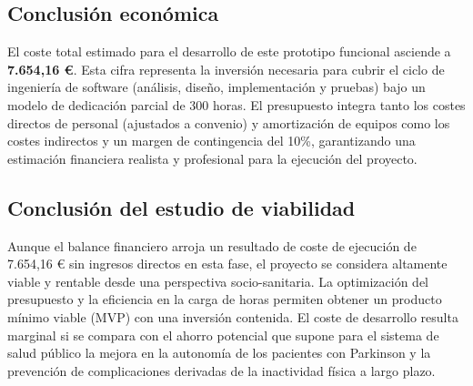 \subsection*{Conclusión económica}
El coste total estimado para el desarrollo de este prototipo funcional asciende a \textbf{7.654,16 €}. Esta cifra representa la inversión necesaria para cubrir el ciclo de ingeniería de software (análisis, diseño, implementación y pruebas) bajo un modelo de dedicación parcial de 300 horas. El presupuesto integra tanto los costes directos de personal (ajustados a convenio) y amortización de equipos como los costes indirectos y un margen de contingencia del 10\%, garantizando una estimación financiera realista y profesional para la ejecución del proyecto.

\subsection*{Conclusión del estudio de viabilidad}
Aunque el balance financiero arroja un resultado de coste de ejecución de 7.654,16 € sin ingresos directos en esta fase, el proyecto se considera altamente viable y rentable desde una perspectiva socio-sanitaria. La optimización del presupuesto y la eficiencia en la carga de horas permiten obtener un producto mínimo viable (MVP) con una inversión contenida. El coste de desarrollo resulta marginal si se compara con el ahorro potencial que supone para el sistema de salud público la mejora en la autonomía de los pacientes con Parkinson y la prevención de complicaciones derivadas de la inactividad física a largo plazo.